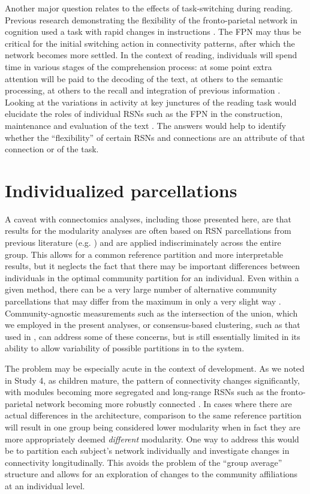 Another major question relates to the effects of task-switching during reading. Previous research demonstrating the flexibility of the fronto-parietal network in cognition used a task with rapid changes in instructions \citep{Cole2013}. The FPN may thus be critical for the initial switching action in connectivity patterns, after which the network becomes more settled. In the context of reading, individuals will spend time in various stages of the comprehension process: at some point extra attention will be paid to the decoding of the text, at others to the semantic processing, at others to the recall and integration of previous information \citep{Spreng2013}. Looking at the variations in activity at key junctures of the reading task would elucidate the roles of individual RSNs such as the FPN in the construction, maintenance and evaluation of the text \citep{Sakai2008}. The answers would help to identify whether the ``flexibility'' of certain RSNs and connections are an attribute of that connection or of the task.

\section{Individualized parcellations}

A caveat with connectomics analyses, including those presented here, are that results for the modularity analyses are often based on RSN parcellations from previous literature (e.g. \citep{Power2011}) and are applied indiscriminately across the entire group. This allows for a common reference partition and more interpretable results, but it neglects the fact that there may be important differences between individuals in the optimal community partition for an individual. Even within a given method, there can be a very large number of alternative community parcellations that may differ from the maximum in only a very slight way \citep{Good2010}. Community-agnostic measurements such as the intersection of the union, which we employed in the present analyses, or consensus-based clustering, such as that used in \citep{Power2011}, can address some of these concerns, but is still essentially limited in its ability to allow variability of possible partitions in to the system. 

The problem may be especially acute in the context of development. As we noted in Study 4, as children mature, the pattern of connectivity changes significantly, with modules becoming more segregated and long-range RSNs such as the fronto-parietal network becoming more robustly connected \citep{Cao2016}. In cases where there are actual differences in the architecture, comparison to the same reference partition will result in one group being considered lower modularity when in fact they are more appropriately deemed \textit{different} modularity. One way to address this would be to partition each subject's network individually and investigate changes in connectivity longitudinally. This avoids the problem of the ``group average'' structure and allows for an exploration of changes to the community affiliations at an individual level. 

